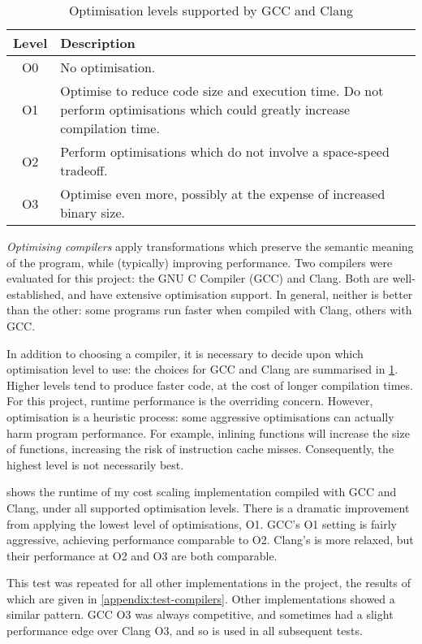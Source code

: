 \begin{table}
    \centering
    \begin{tabular}{cp{}}
        \textbf{Level} & \textbf{Description}\tabularnewline
        \hline
        O0 & No optimisation. \tabularnewline
        O1 & Optimise to reduce code size and execution time. Do not perform optimisations which could greatly increase compilation time. \tabularnewline
        O2 & Perform optimisations which do not involve a space-speed tradeoff. \tabularnewline 
        O3 & Optimise even more, possibly at the expense of increased binary size. \tabularnewline
    \end{tabular}
    \caption{Optimisation levels supported by GCC and Clang}
    \label{table:optimisation-flags}
\end{table}

\emph{Optimising compilers} apply transformations which preserve the semantic meaning of the program, while (typically) improving performance. Two compilers were evaluated for this project: the GNU C Compiler (GCC) and Clang. Both are well-established, and have extensive optimisation support. In general, neither is better than the other: some programs run faster when compiled with Clang, others with GCC.

In addition to choosing a compiler, it is necessary to decide upon which optimisation level to use: the choices for GCC and Clang are summarised in \cref{table:optimisation-flags}. Higher levels tend to produce faster code, at the cost of longer compilation times. For this project, runtime performance is the overriding concern. However, optimisation is a heuristic process: some aggressive optimisations can actually harm program performance. For example, inlining functions will increase the size of functions, increasing the risk of instruction cache misses. Consequently, the highest level is not necessarily best.

 shows the runtime of my cost scaling implementation compiled with GCC and Clang, under all supported optimisation levels. There is a dramatic improvement from applying the lowest level of optimisations, O1. GCC's O1 setting is fairly aggressive, achieving performance comparable to O2. Clang's is more relaxed, but their performance at O2 and O3 are both comparable.

This test was repeated for all other implementations in the project, the results of which are given in \cref{appendix:test-compilers}. Other implementations showed a similar pattern\footnotemark. GCC O3 was always competitive, and sometimes had a slight performance edge over Clang O3, and so is used in all subsequent tests.

